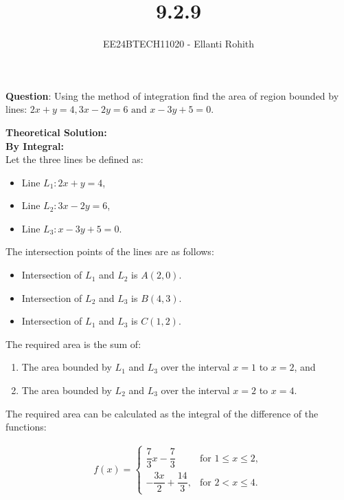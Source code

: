 \documentclass[journal]{IEEEtran}
\numberwithin{equation}{enumi}
\numberwithin{figure}{enumi}
\renewcommand{\thetable}{\theenumi}
\begin{document}

\vspace{3cm}

\title{9.2.9}
\author{EE24BTECH11020 - Ellanti Rohith}
\maketitle

\renewcommand{\thefigure}{\theenumi}
\renewcommand{\thetable}{\theenumi}

\textbf{Question}: Using the method of integration find the area of region bounded by lines: $2x+y=4,3x-2y=6\text{ and } x-3y+5=0$.
\\
\vspace{3.5pt}


\textbf{Theoretical Solution:} \\
\textbf{By Integral:}\\
Let the three lines be defined as:  
\begin{itemize}
    \item Line $ L_1: 2x + y = 4 $,  
    \item Line $ L_2: 3x - 2y = 6 $,  
    \item Line $ L_3: x - 3y + 5 = 0 $.  
\end{itemize}

The intersection points of the lines are as follows:  
\begin{itemize}
    \item Intersection of $ L_1 $ and $ L_2 $ is $ A(2, 0) $.  
    \item Intersection of $ L_2 $ and $ L_3 $ is $ B(4, 3) $.  
    \item Intersection of $ L_1 $ and $ L_3 $ is $ C(1, 2) $.  
\end{itemize}

The required area is the sum of:  
\begin{enumerate}
    \item The area bounded by $ L_1 $ and $ L_3 $ over the interval $ x = 1 $ to $ x = 2 $, and  
    \item The area bounded by $ L_2 $ and $ L_3 $ over the interval $ x = 2 $ to $ x = 4 $.  
\end{enumerate}

The required area can be calculated as the integral of the difference of the functions:  



\begin{align}
f(x) = 
\begin{cases} 
     \dfrac{7}{3}x - \dfrac{7}{3}
 & \text{for } 1 \leq x \leq 2, \\[10pt]
 -\dfrac{3x}{2} + \dfrac{14}{3}, & \text{for } 2 < x \leq 4.
\end{cases}
\end{align}
\end{document}
